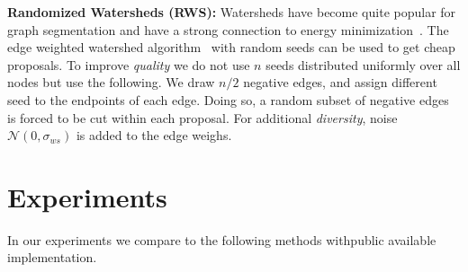 \documentclass[10pt,twocolumn,letterpaper]{article}
\theoremstyle{definition}
\begin{document}
%

\noindent \textbf{Randomized Watersheds (RWS):}
Watersheds have become quite popular for
graph segmentation and have a strong connection
to energy minimization~\cite{couprie_2011}.
%
The edge weighted watershed algorithm~\cite{meyer_2013}
with random seeds can be used to get
cheap proposals.
To improve \emph{quality} we do not use $n$ seeds distributed uniformly
over all nodes but use the following.
%
We draw $n/2$ negative edges, and assign different seed to the endpoints
of each edge.
Doing so, a random subset of negative edges is forced
to be cut within each proposal.
For additional \emph{diversity}, noise $\mathcal{N} (0, \sigma_{ws})$
is added to the edge weighs.

%



\section{Experiments}\label{sec:exp}
In our experiments we compare to the following methods withpublic available implementation.
\end{document}
